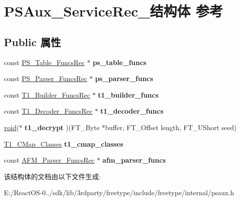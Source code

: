 \hypertarget{struct_p_s_aux___service_rec__}{}\section{P\+S\+Aux\+\_\+\+Service\+Rec\+\_\+结构体 参考}
\label{struct_p_s_aux___service_rec__}
\subsection*{Public 属性}
\begin{DoxyCompactItemize}
\item 
\mbox{\label{struct_p_s_aux___service_rec___ad328bf7394cad5b2838822aa109acc42}} 
const \hyperlink{struct_p_s___table___funcs_rec__}{P\+S\+\_\+\+Table\+\_\+\+Funcs\+Rec} $\ast$ {\bfseries ps\+\_\+table\+\_\+funcs}
\item 
\mbox{\label{struct_p_s_aux___service_rec___ac673695e814332b38fd33c7f0287a4b7}} 
const \hyperlink{struct_p_s___parser___funcs_rec__}{P\+S\+\_\+\+Parser\+\_\+\+Funcs\+Rec} $\ast$ {\bfseries ps\+\_\+parser\+\_\+funcs}
\item 
\mbox{\label{struct_p_s_aux___service_rec___a3fe7449b123d0fb6f7ba92462c4e94c1}} 
const \hyperlink{struct_t1___builder___funcs_rec__}{T1\+\_\+\+Builder\+\_\+\+Funcs\+Rec} $\ast$ {\bfseries t1\+\_\+builder\+\_\+funcs}
\item 
\mbox{\label{struct_p_s_aux___service_rec___a5cfe03f55fa4c342a094fd31355835b2}} 
const \hyperlink{struct_t1___decoder___funcs_rec__}{T1\+\_\+\+Decoder\+\_\+\+Funcs\+Rec} $\ast$ {\bfseries t1\+\_\+decoder\+\_\+funcs}
\item 
\mbox{\label{struct_p_s_aux___service_rec___a8f56c369db4df9268b255dba29aadc9f}} 
\hyperlink{interfacevoid}{void}($\ast$ {\bfseries t1\+\_\+decrypt} )(F\+T\+\_\+\+Byte $\ast$buffer, F\+T\+\_\+\+Offset length, F\+T\+\_\+\+U\+Short seed)
\item 
\mbox{\label{struct_p_s_aux___service_rec___a4ac30b929dcc6127200baea07b5b406a}} 
\hyperlink{struct_t1___c_map___classes_rec__}{T1\+\_\+\+C\+Map\+\_\+\+Classes} {\bfseries t1\+\_\+cmap\+\_\+classes}
\item 
\mbox{\label{struct_p_s_aux___service_rec___a9ddf18cc18487266a3e1dd7721fd12fb}} 
const \hyperlink{struct_a_f_m___parser___funcs_rec__}{A\+F\+M\+\_\+\+Parser\+\_\+\+Funcs\+Rec} $\ast$ {\bfseries afm\+\_\+parser\+\_\+funcs}
\end{DoxyCompactItemize}


该结构体的文档由以下文件生成\+:\begin{DoxyCompactItemize}
\item 
E\+:/\+React\+O\+S-\/0../sdk/lib/3rdparty/freetype/include/freetype/internal/psaux.\+h\end{DoxyCompactItemize}
